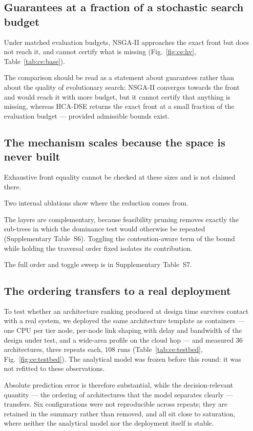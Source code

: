 \subsection*{Guarantees at a fraction of a stochastic search budget}
Under matched evaluation budgets, NSGA-II approaches the exact front but does not reach
it, and cannot certify what is missing (Fig.~\ref{fig:ce:hv}, Table~\ref{tab:ce:base}).

The comparison should be read as a statement about guarantees rather than about the
quality of evolutionary search: NSGA-II converges towards the front and would reach it
with more budget, but it cannot certify that anything is missing, whereas HCA-DSE returns
the exact front at a small fraction of the evaluation budget --- provided admissible
bounds exist.

\subsection*{The mechanism scales because the space is never built}

Exhaustive front equality cannot be checked at these sizes and is not claimed there.

Two internal ablations show where the reduction comes from.

The layers are complementary, because feasibility pruning removes exactly the sub-trees in
which the dominance test would otherwise be repeated (Supplementary Table~S6). Toggling
the contention-aware term of the bound while holding the traversal order fixed isolates
its contribution.

The full order and toggle sweep is in Supplementary Table~S7.

\subsection*{The ordering transfers to a real deployment}
To test whether an architecture ranking produced at design time survives contact with a
real system, we deployed the same architecture template as containers --- one CPU per
tier node, per-node link shaping with delay and bandwidth of the design under test, and a
wide-area profile on the cloud hop --- and measured $36$ architectures, three repeats
each, $108$ runs (Table~\ref{tab:ce:testbed}, Fig.~\ref{fig:ce:testbed}). The analytical
model was frozen before this round: it was not refitted to these observations.

Absolute prediction error is therefore substantial, while the decision-relevant quantity
--- the ordering of architectures that the model separates clearly --- transfers. Six
configurations were not reproducible across repeats; they are retained in the summary
rather than removed, and all sit close to saturation, where neither the analytical model
nor the deployment itself is stable.
